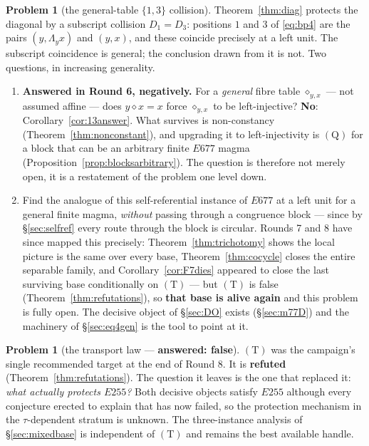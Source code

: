 \documentclass[11pt]{article}
\theoremstyle{plain}
\theoremstyle{definition}
\newtheorem{problem}[theorem]{Problem}
\theoremstyle{remark}
\numberwithin{equation}{section}
\begin{document}
\begin{problem}[the general-table $\{1,3\}$ collision]\label{prob:13collision}
Theorem~\ref{thm:diag} protects the diagonal by a subscript collision $D_1 = D_3$: positions
$1$ and $3$ of \eqref{eq:bp4} are the pairs $(y,\Lambda_yx)$ and $(y,x)$, and these coincide
precisely at a left unit. The subscript coincidence is general; the conclusion drawn from it
is not. Two questions, in increasing generality.
\begin{enumerate}
\item[(a)] \textbf{Answered in Round 6, negatively.} For a \emph{general} fibre table
$\diamond_{y,x}$ --- not assumed affine --- does $y\diamond x = x$ force $\diamond_{y,x}$ to
be left-injective? \textbf{No}: Corollary~\ref{cor:13answer}. What survives is
non-constancy (Theorem~\ref{thm:nonconstant}), and upgrading it to left-injectivity is
$(\mathrm{Q})$ for a block that can be an arbitrary finite $E677$ magma
(Proposition~\ref{prop:blocksarbitrary}). The question is therefore not merely open, it is
a restatement of the problem one level down.
\item[(b)] Find the analogue of this self-referential instance of $E677$ at a left unit for a
general finite magma, \emph{without} passing through a congruence block --- since by
\S\ref{sec:selfref} every route through the block is circular. Rounds 7 and 8 have since
mapped this precisely: Theorem~\ref{thm:trichotomy} shows the local picture is the same over
every base, Theorem~\ref{thm:cocycle} closes the entire separable family, and
Corollary~\ref{cor:F7dies} appeared to close the last surviving base conditionally on
$(\mathrm{T})$ --- but $(\mathrm{T})$ is false (Theorem~\ref{thm:refutations}), so
\textbf{that base is alive again} and this problem is fully open. The decisive
object of \S\ref{sec:DO} exists (\S\ref{sec:m77D}) and the machinery of
\S\ref{sec:eq4gen} is the tool to point at it.
\end{enumerate}
\end{problem}

\begin{problem}[the transport law --- \textbf{answered: false}]\label{prob:T}
$(\mathrm{T})$ was the campaign's single recommended target at the end of Round 8.
It is \textbf{refuted} (Theorem~\ref{thm:refutations}). The question it leaves is
the one that replaced it: \emph{what actually protects $E255$?} Both decisive
objects satisfy $E255$ although every conjecture erected to explain that has now
failed, so the protection mechanism in the $\tau$-dependent stratum is unknown.
The three-instance analysis of \S\ref{sec:mixedbase} is independent of
$(\mathrm{T})$ and remains the best available handle.
\end{problem}
\end{document}
